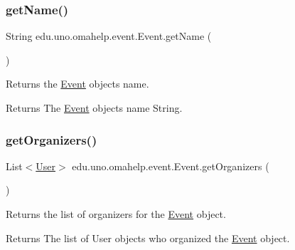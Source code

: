 \subsubsection{\texorpdfstring{get\+Name()}{getName()}}
{\footnotesize\ttfamily String edu.\+uno.\+omahelp.\+event.\+Event.\+get\+Name (\begin{DoxyParamCaption}{ }\end{DoxyParamCaption})}

Returns the \mbox{\hyperlink{classedu_1_1uno_1_1omahelp_1_1event_1_1_event}{Event}} object\textquotesingle{}s name.

\begin{DoxyReturn}{Returns}
The \mbox{\hyperlink{classedu_1_1uno_1_1omahelp_1_1event_1_1_event}{Event}} object\textquotesingle{}s name String. 
\end{DoxyReturn}
\mbox{\label{classedu_1_1uno_1_1omahelp_1_1event_1_1_event_a9068e3cbcb57d135ff180cab17c0f88e}} 
\subsubsection{\texorpdfstring{get\+Organizers()}{getOrganizers()}}
{\footnotesize\ttfamily List$<$\mbox{\hyperlink{classedu_1_1uno_1_1omahelp_1_1user_1_1_user}{User}}$>$ edu.\+uno.\+omahelp.\+event.\+Event.\+get\+Organizers (\begin{DoxyParamCaption}{ }\end{DoxyParamCaption})}

Returns the list of organizers for the \mbox{\hyperlink{classedu_1_1uno_1_1omahelp_1_1event_1_1_event}{Event}} object.

\begin{DoxyReturn}{Returns}
The list of User objects who organized the \mbox{\hyperlink{classedu_1_1uno_1_1omahelp_1_1event_1_1_event}{Event}} object. 
\end{DoxyReturn}
\mbox{\label{classedu_1_1uno_1_1omahelp_1_1event_1_1_event_abc2f6fba0558efc1c46b70f9993b2962}} 
